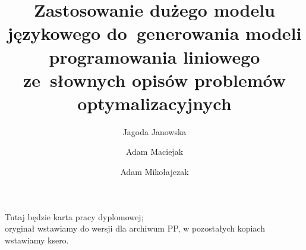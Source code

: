 \documentclass[polish,bachelor,a4paper,oneside]{ppfcmthesis}
\author{%
   Jagoda Janowska \album{151798} \and 
   Adam Maciejak \album{151756} \and
   Adam Mikołajczak \album{151247}}
\title{Zastosowanie dużego modelu językowego do~generowania modeli programowania liniowego ze~słownych opisów problemów optymalizacyjnych}
\begin{document}
\frontmatter\pagestyle{empty}%
\maketitle\cleardoublepage%


\thispagestyle{empty}\vspace*{\fill}%
\begin{center}Tutaj będzie karta pracy dyplomowej;\\oryginał wstawiamy do wersji dla archiwum PP, w pozostałych kopiach wstawiamy ksero.\end{center}%
\vfill\cleardoublepage%


\pagestyle{ppfcmthesis}%
\tableofcontents* 
\cleardoublepage %


\mainmatter%









{\raggedright\sloppy\small}



\ppcolophon
\end{document}
